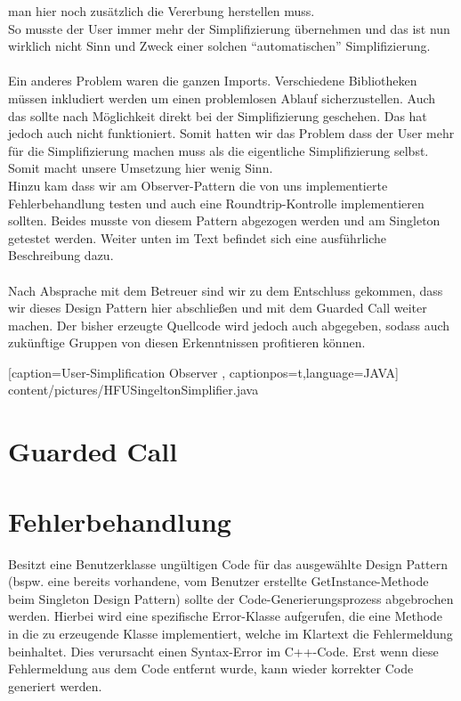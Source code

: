 man hier noch zusätzlich die Vererbung herstellen muss.\\
So musste der User immer mehr der Simplifizierung übernehmen und das ist nun
wirklich nicht Sinn und Zweck einer solchen \enquote{automatischen} Simplifizierung.\\
\\
Ein anderes Problem waren die ganzen Imports. Verschiedene Bibliotheken müssen
inkludiert werden um einen problemlosen Ablauf sicherzustellen. Auch das sollte
nach Möglichkeit direkt bei der Simplifizierung geschehen. Das hat jedoch auch
nicht funktioniert. Somit hatten wir das Problem dass der User mehr für die
Simplifizierung machen muss als die eigentliche Simplifizierung selbst. Somit
macht unsere Umsetzung hier wenig Sinn.\\
Hinzu kam dass wir am Observer-Pattern die von uns implementierte Fehlerbehandlung
testen und auch eine Roundtrip-Kontrolle implementieren sollten. Beides musste
von diesem Pattern abgezogen werden und am Singleton getestet werden. Weiter
unten im Text befindet sich eine ausführliche Beschreibung dazu.\\ \\
Nach Absprache mit dem Betreuer sind wir zu dem Entschluss gekommen, dass wir
dieses Design Pattern hier abschließen und mit dem Guarded Call weiter machen.
Der bisher erzeugte Quellcode wird jedoch auch abgegeben, sodass auch zukünftige
Gruppen von diesen Erkenntnissen profitieren können.

    [caption={User-Simplification Observer}
       \label{lst:javaclass},
       captionpos=t,language=JAVA]
 {content/pictures/HFUSingeltonSimplifier.java} 


\section{Guarded Call}

\section{Fehlerbehandlung}

Besitzt eine Benutzerklasse ungültigen Code für das ausgewählte Design Pattern (bspw. eine 
bereits vorhandene, vom Benutzer erstellte GetInstance-Methode beim Singleton Design Pattern) 
sollte der Code-Generierungsprozess abgebrochen werden. Hierbei wird eine spezifische Error-Klasse aufgerufen, die eine Methode in die zu erzeugende Klasse implementiert, welche im Klartext die Fehlermeldung beinhaltet. Dies verursacht einen Syntax-Error im C++-Code. Erst wenn diese Fehlermeldung aus dem Code entfernt wurde, kann wieder korrekter Code generiert werden.

